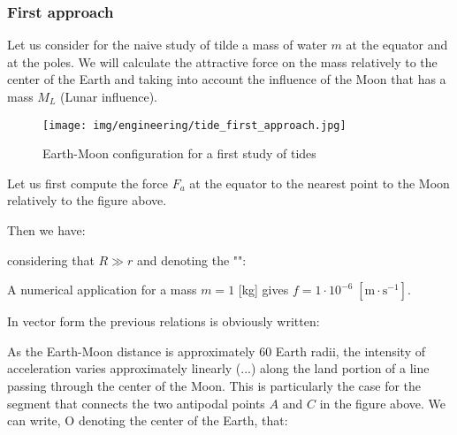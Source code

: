 	\subsubsection{First approach}
	Let us consider for the naive study of tilde a mass of water $m$ at the equator and at the poles. We will calculate the attractive force on the mass relatively to the center of the Earth and taking into account the influence of the Moon that has a mass $M_L$ (Lunar influence).
	\begin{figure}[H]
		\centering
		\texttt{[image: img/engineering/tide\_first\_approach.jpg]}
		\caption[]{Earth-Moon configuration for a first study of tides}
	\end{figure}
	Let us first compute the force $F_a$ at the equator to the nearest point to the Moon relatively to the figure above.

	Then we have:
	
	considering that $R \gg r$ and denoting the "":
	
	A numerical application for a mass $m= 1$ [kg] gives $f=1\cdot 10^{-6}\;[\text{m}\cdot \text{s}^{-1}]$.

	In vector form the previous relations is obviously written:
	
	As the Earth-Moon distance is approximately $60$ Earth radii, the intensity of acceleration varies approximately linearly (...) along the land portion of a line passing through the center of the Moon. This is particularly the case for the segment that connects the two antipodal points $A$ and $C$ in the figure above. We can write, O denoting the center of the Earth, that:
	
